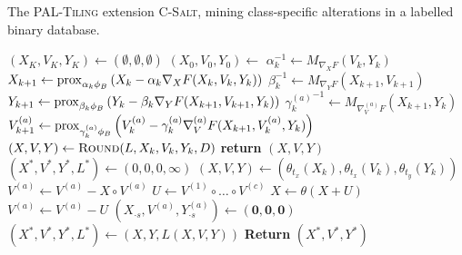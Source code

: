 \begin{algorithm}[t]
\caption{The \textsc{PAL-Tiling} extension \textsc{C-Salt}, mining class-specific alterations in a labelled binary database.}
\begin{algorithmic}[1]
        \State $(X_K,V_K,Y_K)\gets (\emptyset, \emptyset, \emptyset)$
            \State $(X_0,V_0,Y_0) \gets $ 
            \label{alg:csalt:optStart} 
   	        \State $\alpha_k^{-1} \gets M_{\nabla_XF}(V_k,Y_k)$
            \State $X_{k+1} \gets \operatorname{prox}_{\alpha_k\phi_B}\left(X_k-\alpha_k\nabla_XF(X_k,V_k,Y_k)\right)$
            \State $\beta_k^{-1} \gets M_{\nabla_YF}(X_{k+1},V_{k+1})$
            \State $Y_{k+1} \gets \operatorname{prox}_{\beta_k\phi_B}\left(Y_k-\beta_k\nabla_YF(X_{k+1},V_{k+1},Y_k)\right)$
            \State ${\gamma_k^{(a)}}^{-1} \gets M_{\nabla^{(a)}_VF}(X_{k+1},Y_k)$  
            \State $V^{(a)}_{k+1} \gets \operatorname{prox}_{\gamma_k^{(a)}\phi_B}\left(V^{(a)}_k-\gamma_k^{(a)}\nabla^{(a)}_VF(X_{k+1},V_{k}^{(a)},Y_k)\right)$  
    \EndFor\label{alg:csalt:optEnd}
    \State $(X,V,Y)\gets \Call{Round}{L,X_k,V_k,Y_k,D}$
    	\textbf{return} $(X,V,Y)$
    \EndIIf\label{alg:csalt:rankgap}
    \EndFor
    \EndFunction
    \Statex ~
    \State $(X^*,V^*,Y^*,L^*)\gets (0,0,0,\infty)$
    \State $(X,V,Y)\gets (\theta_{t_x}(X_k),\theta_{t_x}(V_k),\theta_{t_y}(Y_k))$\label{alg:csalt:defV1}
    \State $V^{(a)}\gets V^{(a)}-X\circ V^{(a)}$
    \State $U\gets V^{(1)}\circ \ldots \circ V^{(c)}$
    \State $X\gets \theta(X+ U)$
    \State $V^{(a)}\gets V^{(a)}- U$\label{alg:csalt:defV2}
         $(X_{\cdot s},V^{(a)},Y^{(a)}_{\cdot s})\gets (\mathbf{0},\mathbf{0},\mathbf{0})$ \label{alg:csalt:toss}
        \EndIIf
    \EndFor
     $(X^*,V^*,Y^*,L^*)\gets (X,Y,L(X,V,Y))$ 
    \EndIIf
  \EndFor
  \State \textbf{Return} $(X^*,V^*,Y^*)$
  \EndFunction
\end{algorithmic}
\label{alg:C-Salt}
\end{algorithm}
